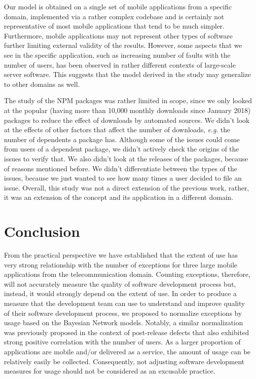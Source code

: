 \documentclass[smallextended]{svjour3}       %
\begin{document}
Our model is obtained on a single set of mobile applications 
from a specific domain, implemented via
a rather complex codebase and is certainly not representative of
most mobile applications that tend to be much simpler. Furthermore,
mobile applications  
may not represent other types of software further limiting external
validity of the results. However, some aspects that we see in the
specific application, such as increasing number of faults with the
number of users, has been observed in rather different contexts of
large-scale server software. This suggests that the model derived in
the study may generalize to other domains as well. 

The study of the NPM packages was rather limited in scope, since we
only looked at the popular (having more than 10,000 monthly downloads 
since January 2018) packages to reduce the effect of downloads by 
automated sources. We didn't look at the effects of other factors 
that affect the number of downloads, \emph{e.g.} the number of 
dependents a package has. Although some of the issues could come 
from users of a dependent package, we didn't actively check the
origins of the issues to verify that. We also didn't look at the
releases of the packages, because of reasons mentioned before.
We didn't differentiate between the types of the issues, because we 
just wanted to see how many times a user decided to file an issue.
Overall, this study was not a direct extension of the previous work,
rather, it was an extension of the concept and its application in a different domain.


\vspace{-10pt}
\section{Conclusion}\label{s:conclusion}

From the practical perspective we have established
that the extent of use has very strong relationship with the number
of exceptions for three large mobile applications from 
the telecommunication domain. Counting exceptions,
therefore, will not accurately measure the quality of software
development process but, instead, it would strongly depend on the
extent of use. In order to produce a measure that the development
team can use to understand and improve quality of their software
development process, we proposed to normalize exceptions by usage
based on the Bayesian Network models. Notably, a similar
normalization was previously proposed in the context of post-release
defects that also exhibited strong positive correlation with the
number of users.  As a larger proportion of applications are mobile
and/or delivered as a service, the amount of usage can be relatively
easily be collected.  Consequently, not adjusting software
development measures for usage should not be considered as an
excusable practice.
\end{document}
